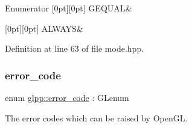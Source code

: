 \begin{DoxyEnumFields}{Enumerator}
[0pt][0pt]{}\mbox{\label{namespaceglpp_aa44c8e6b80225228552f747c73ba7186a9e63a520a6e8fefd37a5fa966d96f3bc}} 
G\+E\+Q\+U\+AL&\\
\hline

[0pt][0pt]{}\mbox{\label{namespaceglpp_aa44c8e6b80225228552f747c73ba7186af3fc827ade4b968e50406496907ef962}} 
A\+L\+W\+A\+YS&\\
\hline

\end{DoxyEnumFields}


Definition at line 63 of file mode.\+hpp.

\mbox{\label{namespaceglpp_a1fe5e1dcc793337b3958e3cd2352432c}} 
\subsubsection{\texorpdfstring{error\+\_\+code}{error\_code}}
{\footnotesize\ttfamily enum \hyperlink{namespaceglpp_a1fe5e1dcc793337b3958e3cd2352432c}{glpp\+::error\+\_\+code} \+: G\+Lenum\hspace{0.3cm}{\ttfamily [strong]}}



The error codes which can be raised by Open\+GL. 

